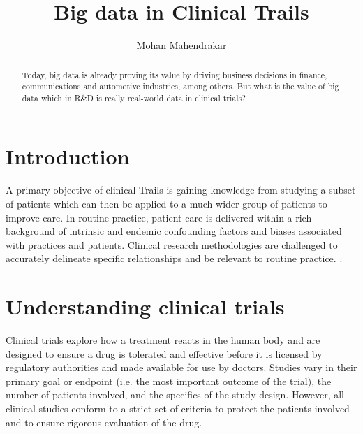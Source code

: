 \documentclass[sigconf]{acmart}
\begin{document}
\title{Big data in Clinical Trails}


\author{Mohan Mahendrakar}

\renewcommand{\shortauthors}{B. Trovato et al.}


\begin{abstract}
Today, big data is already proving its value by driving business decisions in finance, communications and automotive industries, among others. But what is the value of big data which in R\&D is really real-world data in clinical trials?
\end{abstract}


\maketitle

\section{Introduction}
A primary objective of clinical Trails is gaining knowledge from studying a subset of patients which can then be applied to a much wider group of patients to improve care. In routine practice, patient care is delivered within a rich background of intrinsic and endemic confounding factors and biases associated with practices and patients. Clinical research methodologies are challenged to accurately delineate specific relationships and be relevant to routine practice. \cite{Abri0l}.

\section{Understanding clinical trials}
Clinical trials explore how a treatment reacts in the human body and are designed to
ensure a drug is tolerated and effective before it is licensed by regulatory authorities
and made available for use by doctors. Studies vary in their primary goal or endpoint
(i.e. the most important outcome of the trial), the number of patients involved, and the
specifics of the study design. However, all clinical studies conform to a strict set of
criteria to protect the patients involved and to ensure rigorous evaluation of the drug\cite{Abr02}.
\end{document}
